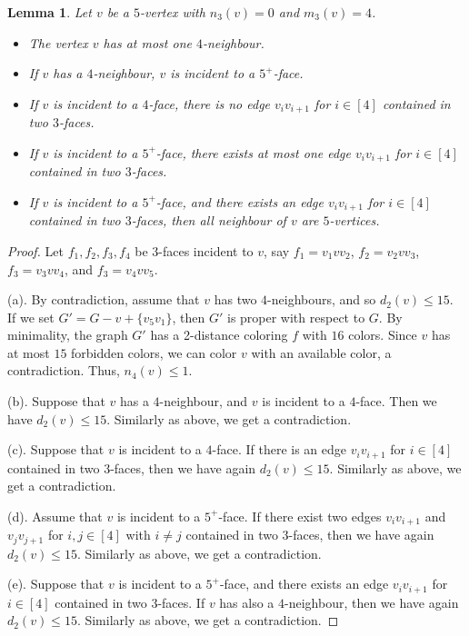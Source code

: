 \documentclass[12pt, reqno]{amsart}
\theoremstyle{plain}
\newtheorem{lemma}[equation]{Lemma}
\theoremstyle{definition}
\numberwithin{equation}{section}
\begin{document}
\begin{lemma}\label{lem:5-vertex-n3-0-m3-4}
Let $v$ be a $5$-vertex with  $n_3(v)= 0$ and $m_3(v)=4$. 
\begin{itemize}
\item[$(a)$] The vertex $v$ has at  most one $4$-neighbour.
\item[$(b)$] If  $v$ has a $4$-neighbour, $v$ is incident to a $5^+$-face.
\item[$(c)$] If $v$ is incident to a $4$-face, there is no edge $v_iv_{i+1}$ for $i\in [4]$ contained in two $3$-faces.
\item[$(d)$] If $v$ is incident to a $5^+$-face, there exists at most one edge $v_iv_{i+1}$ for $i\in [4]$ contained in two $3$-faces. 
\item[$(e)$] If $v$ is incident to a $5^+$-face, and there exists an edge $v_iv_{i+1}$ for $i\in [4]$ contained in two $3$-faces, then all neighbour of $v$ are $5$-vertices.
\end{itemize}
\end{lemma}


\begin{proof}
Let $f_1,f_2,f_3,f_4$ be $3$-faces incident to $v$, say $f_1=v_1vv_2$, $f_2=v_2vv_3$, $f_3=v_3vv_4$, and $f_3=v_4vv_5$.

(a). By contradiction, assume that $v$ has two $4$-neighbours, and so $d_2(v)\leq 15$. If we set $G'=G-v+\{v_5v_1\}$, then $G'$ is proper with respect to $G$. By minimality, the graph $G'$ has a 2-distance coloring $f$ with $16$ colors. Since $v$ has at most $15$ forbidden colors, we can color $v$ with an available color, a contradiction. Thus, $n_4(v)\leq 1$. 

(b). Suppose that $v$ has a $4$-neighbour, and  $v$ is incident to a $4$-face. Then we have  $d_2(v)\leq 15$. Similarly as above, we get a contradiction.


(c). Suppose that $v$ is incident to a $4$-face. If there is an edge $v_iv_{i+1}$ for $i\in [4]$ contained in two $3$-faces, then we have again $d_2(v)\leq 15$. Similarly as above, we get a contradiction. 



(d). Assume that  $v$ is incident to a $5^+$-face. If there exist two edges $v_iv_{i+1}$  and $v_jv_{j+1}$ for $i,j\in [4]$ with $i\neq j$  contained in two $3$-faces, then we have again $d_2(v)\leq 15$. Similarly as above, we get a contradiction.


(e). Suppose that $v$ is incident to a $5^+$-face, and there exists an edge $v_iv_{i+1}$ for $i\in [4]$ contained in two $3$-faces. If $v$ has also a $4$-neighbour, then we have again $d_2(v)\leq 15$. Similarly as above, we get a contradiction. 
\end{proof}
\end{document}
